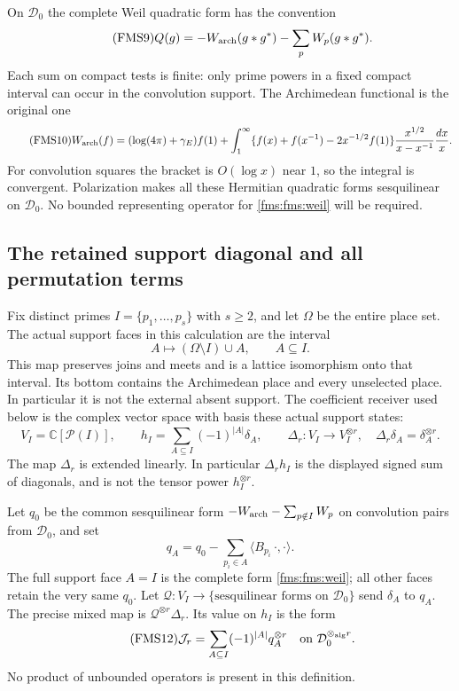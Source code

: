 \documentclass[11pt,a4paper]{article}
\theoremstyle{definition}\newtheorem{definition}[theorem]{Definition}
\newcommand{\C}{\mathbb C}\newcommand{\R}{\mathbb R}
\begin{document}
On $\mathcal D_0$ the complete Weil quadratic form has the convention
\begin{equation}\tag{FMS9}\label{fms:fms:weil}
 Q(g)=-W_{\rm arch}(g*g^*)-\sum_p W_p(g*g^*).
\end{equation}
Each sum on compact tests is finite: only prime powers in a fixed
compact interval can occur in the convolution support.
The Archimedean functional is the original one
\begin{equation}\tag{FMS10}\label{fms:fms:arch}
 W_{\rm arch}(f)
 =(\log(4\pi)+\gamma_E)f(1)+
 \int_1^\infty
 \{f(x)+f(x^{-1})-2x^{-1/2}f(1)\}
       \frac{x^{1/2}}{x-x^{-1}}\frac{dx}{x}.
\end{equation}
For convolution squares the bracket is $O(\log x)$ near $1$, so
the integral is convergent.  Polarization makes all these Hermitian
quadratic forms sesquilinear on $\mathcal D_0$.  No bounded
representing operator for \eqref{fms:fms:weil} will be required.

\subsection{The retained support diagonal and all permutation terms}

Fix distinct primes $I=\{p_1,\ldots,p_s\}$ with $s\ge2$, and let
$\Omega$ be the entire place set.  The actual support faces in this
calculation are the interval
\[
 A\longmapsto(\Omega\setminus I)\cup A,\qquad A\subseteq I.
\]
This map preserves joins and meets and is a lattice isomorphism
onto that interval. Its bottom contains the Archimedean place and
every unselected place.  In particular it is not the external
absent support.  The coefficient receiver used below is the complex
vector space with basis these actual support states:
\begin{equation}\tag{FMS11}\label{fms:fms:diagonal}
 V_I=\C[\mathcal P(I)],\qquad
 h_I=\sum_{A\subseteq I}(-1)^{|A|}\delta_A,\qquad
 \Delta_r:V_I\longrightarrow V_I^{\otimes r},\quad
 \Delta_r\delta_A=\delta_A^{\otimes r}.
\end{equation}
The map $\Delta_r$ is extended linearly.  In particular
$\Delta_rh_I$ is the displayed signed sum of diagonals, and is not
the tensor power $h_I^{\otimes r}$.

Let $q_0$ be the common sesquilinear form
$-W_{\rm arch}-\sum_{p\notin I}W_p$ on convolution pairs from
$\mathcal D_0$, and set
\[
 q_A=q_0-\sum_{p_i\in A}\langle B_{p_i}\,\cdot,\cdot\rangle.
\]
The full support face $A=I$ is the complete form
\eqref{fms:fms:weil}; all other faces retain the very same $q_0$.
Let $\mathcal Q:V_I\to
\{\text{sesquilinear forms on }\mathcal D_0\}$ send
$\delta_A$ to $q_A$.  The precise mixed map is
$\mathcal Q^{\otimes r}\Delta_r$.  Its value on $h_I$ is the form
\begin{equation}\tag{FMS12}\label{fms:fms:mixedform}
 \mathcal J_r=\sum_{A\subseteq I}(-1)^{|A|}q_A^{\otimes r}
 \quad\hbox{on }\mathcal D_0^{\otimes_{\rm alg} r}.
\end{equation}
No product of unbounded operators is present in this definition.
\end{document}

